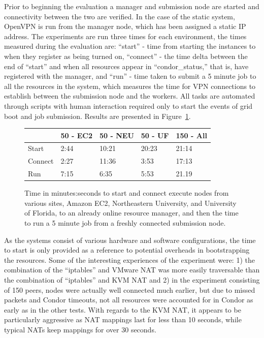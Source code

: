 \documentclass[conference]{IEEEtran}
\begin{document}
Prior to beginning the evaluation a manager and submission node are started and
connectivity between the two are verified.  In the case of the static system,
OpenVPN is run from the manager node, which has been assigned a static IP
address.  The experiments are run three times for each environment, the times
measured during the evaluation are: ``start'' - time from starting the
instances to when they register as being turned on, ``connect'' - the time
delta between the end of ``start'' and when all resources appear in
``condor\_status,'' that is, have registered with the manager, and ``run'' -
time taken to submit a 5 minute job to all the resources in the system, which
measures the time for VPN connections to establish between the submission node
and the workers.  All tasks are automated through scripts with human
interaction required only to start the events of grid boot and job submission.
Results are presented in Figure~\ref{fig:results}.

\begin{figure}[ht]
\small{
\setlength{\itemsep}{0pt}
\setlength{\parskip}{0pt}
\centering
\begin{tabular}[c]{|m{1.0cm}||m{1.2cm}|m{1.3cm}|m{1.2cm}|m{1.2cm}|} \hline
& 50 - EC2 & 50 - NEU & 50 - UF & 150 - All \\ \hline\hline
Start & 2:44 & 10:21 & 20:23 & 21:14 \\ \hline
Connect & 2:27 & 11:36 & 3:53 & 17:13\\ \hline
Run & 7:15 & 6:35 & 5:53 & 21.19 \\ \hline
\end{tabular}
\caption{\small{Time in minutes:seconds to start and connect execute nodes from
various sites, Amazon EC2, Northeastern University, and University of Florida,
to an already online resource manager, and then the time to run a 5 minute job
from a freshly connected submission node.}}
\label{fig:results}
}
\end{figure}

As the systems consist of various hardware and software configurations, the
time to start is only provided as a reference to potential overheads in
bootstrapping the resources.  Some of the interesting experiences of the
experiment were:  1) the combination of the ``iptables'' and VMware NAT was
more easily traversable than the combination of ``iptables'' and KVM NAT and 2)
in the experiment consisting of 150 peers, nodes were actually well connected
much earlier, but due to missed packets and Condor timeouts, not all resources
were accounted for in Condor as early as in the other tests.  With regards to
the KVM NAT, it appears to be particularly aggressive as NAT mappings last for
less than 10 seconds, while typical NATs keep mappings for over 30 seconds.
\end{document}
